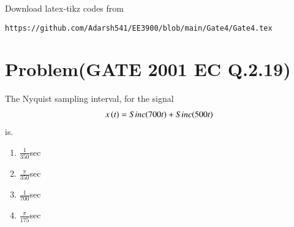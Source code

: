 \documentclass[journal,12pt,twocolumn]{IEEEtran}
\begin{document}
%
Download latex-tikz codes from 
%
\begin{lstlisting}
https://github.com/Adarsh541/EE3900/blob/main/Gate4/Gate4.tex
\end{lstlisting}
\section{Problem(GATE 2001 EC Q.2.19)}
The Nyquist sampling interval, for the signal
\begin{align}
    x\left(t\right) = Sinc(700t)+Sinc(500t)
\end{align}
is.
\begin{enumerate}
    \item $\frac{1}{350}$sec\\
    \item $\frac{\pi}{350}$sec\\
    \item $\frac{1}{700}$sec\\
    \item $\frac{\pi}{175}$sec
\end{enumerate}
\end{document}
